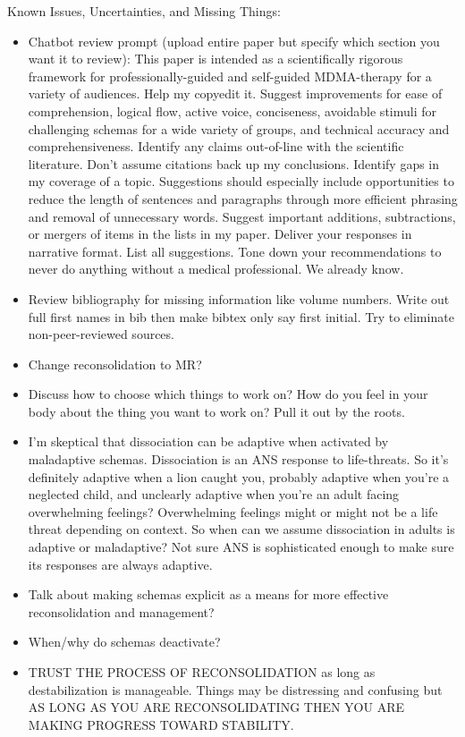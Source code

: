 \documentclass[12pt,letterpaper]{article}
\begin{document}
Known Issues, Uncertainties, and Missing Things:
\begin{itemize}
    \item Chatbot review prompt (upload entire paper but specify which section you want it to review):
        This paper is intended as a scientifically rigorous framework for professionally-guided and self-guided MDMA-therapy for a variety of audiences. Help my copyedit it.
        Suggest improvements for ease of comprehension, logical flow, active voice, conciseness, avoidable stimuli for challenging schemas for a wide variety of groups, and technical accuracy and comprehensiveness.
        Identify any claims out-of-line with the scientific literature. Don't assume citations back up my conclusions. Identify gaps in my coverage of a topic.
        Suggestions should especially include opportunities to reduce the length of sentences and paragraphs through more efficient phrasing and removal of unnecessary words.
        Suggest important additions, subtractions, or mergers of items in the lists in my paper.
        Deliver your responses in narrative format. List all suggestions.
        Tone down your recommendations to never do anything without a medical professional. We already know.
    \item Review bibliography for missing information like volume numbers. Write out full first names in bib then make bibtex only say first initial. Try to eliminate non-peer-reviewed sources.
    \item Change reconsolidation to MR?
    \item Discuss how to choose which things to work on? How do you feel in your body about the thing you want to work on? Pull it out by the roots.
    \item I'm skeptical that dissociation can be adaptive when activated by maladaptive schemas. Dissociation is an ANS response to life-threats. So it's definitely adaptive when a lion caught you, probably adaptive when you're a neglected child, and unclearly adaptive when you're an adult facing overwhelming feelings? Overwhelming feelings might or might not be a life threat depending on context. So when can we assume dissociation in adults is adaptive or maladaptive? Not sure ANS is sophisticated enough to make sure its responses are always adaptive.
    \item Talk about making schemas explicit as a means for more effective reconsolidation and management?
    \item When/why do schemas deactivate?
    \item TRUST THE PROCESS OF RECONSOLIDATION as long as destabilization is manageable. Things may be distressing and confusing but AS LONG AS YOU ARE RECONSOLIDATING THEN YOU ARE MAKING PROGRESS TOWARD STABILITY.

\end{itemize}
\end{document}
